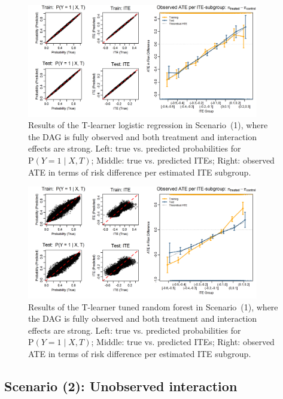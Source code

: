 \begin{figure}[htbp]
\centering
\includegraphics[width=0.9\textwidth]{img/results_ITE_simulation/fully_observed_glm_tlearner.png}
\caption{Results of the T-learner logistic regression in Scenario~(1), where the DAG is fully observed and both treatment and interaction effects are strong. Left: true vs. predicted probabilities for $\text{P}(Y = 1 \mid X, T)$; Middle: true vs. predicted ITEs; Right: observed ATE in terms of risk difference per estimated ITE subgroup.}
\label{fig:fully_observed_glm_tlearner}
\end{figure}


\begin{figure}[htbp]
\centering
\includegraphics[width=0.9\textwidth]{img/results_ITE_simulation/fully_observed_tuned_rf_tlearner.png}
\caption{Results of the T-learner tuned random forest in Scenario~(1), where the DAG is fully observed and both treatment and interaction effects are strong. Left: true vs. predicted probabilities for $\text{P}(Y = 1 \mid X, T)$; Middle: true vs. predicted ITEs; Right: observed ATE in terms of risk difference per estimated ITE subgroup.}
\label{fig:fully_tuned_rf_tlearner}
\end{figure}


\clearpage



\subsection{Scenario (2): Unobserved interaction}

